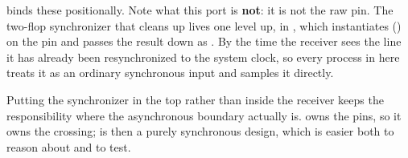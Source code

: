  binds these positionally. Note what this port is \textbf{not}: it is not the raw
pin. The two-flop synchronizer that cleans up  lives one level up, in ,
which instantiates  () on the pin and passes the result down as
. By the time the receiver sees the line it has already been resynchronized to the
system clock, so every process in here treats it as an ordinary synchronous input and samples it
directly.

Putting the synchronizer in the top rather than inside the receiver keeps the responsibility where
the asynchronous boundary actually is.  owns the pins, so it owns the crossing;
 is then a purely synchronous design, which is easier both to reason about and to
test.

